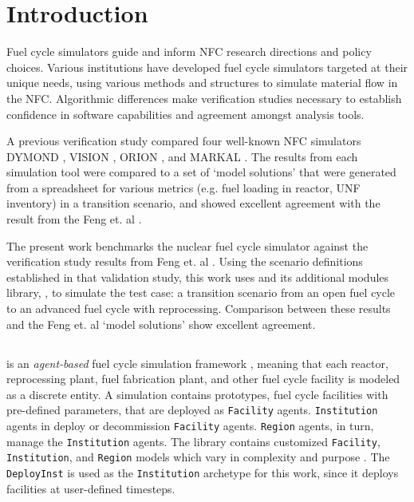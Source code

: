 
\section{Introduction}
Fuel cycle simulators guide and inform \gls{NFC} research directions and policy choices.
Various institutions have developed fuel cycle simulators targeted at their unique needs,
using various methods and structures
to simulate material flow in the \gls{NFC}.
Algorithmic differences make
verification studies necessary to establish
confidence in software capabilities and
agreement amongst analysis tools.

A previous verification study \cite{feng_standardized_2016} compared
four well-known \gls{NFC} simulators
DYMOND \cite{yacout_modeling_2005},
VISION \cite{jacobson_verifiable_2010},
ORION \cite{gregg_analysis_2012}, and
MARKAL \cite{shay_epa_2006}. The results from each simulation tool
were compared to a set of `model solutions' that were generated
from a spreadsheet for various metrics (e.g. fuel loading in reactor,
\gls{UNF} inventory) in a transition scenario, and showed excellent agreement
with the result from the Feng et. al \cite{feng_standardized_2016}.

The present work benchmarks the \Cyclus nuclear fuel cycle simulator 
\cite{huff_fundamental_2016}
against the verification study results from Feng et. al 
\cite{feng_standardized_2016}.
Using the scenario definitions established in that validation study,
this work uses \Cyclus and its additional modules library, \Cycamore, to simulate the test case: a transition scenario from an
open fuel cycle to an advanced fuel cycle with
reprocessing. Comparison between these results and the Feng et. al `model solutions'
show excellent agreement.


\subsection{\Cyclus}

\Cyclus is an \emph{agent-based} fuel cycle simulation framework 
\cite{huff_fundamental_2016}, meaning 
that each reactor, reprocessing plant, fuel fabrication plant, and other fuel cycle
facility is modeled as a discrete entity.
A \Cyclus simulation contains prototypes, fuel cycle facilities with
pre-defined parameters, that are deployed as \texttt{Facility} agents.
\texttt{Institution} agents in \Cyclus deploy or decommission \texttt{Facility} agents.
\texttt{Region} agents, in turn, manage the \texttt{Institution}
agents.
The \Cycamore library contains customized \texttt{Facility}, 
\texttt{Institution}, and \texttt{Region} models which vary in complexity and purpose \cite{huff_extensions_2014}.
The \Cycamore \texttt{DeployInst} is used as the \texttt{Institution} archetype for this 
 work, since it deploys facilities at user-defined timesteps.
